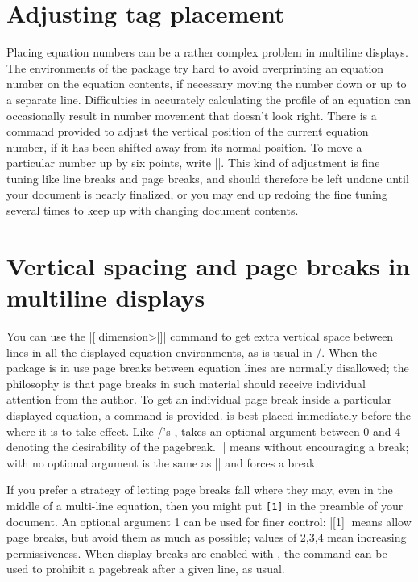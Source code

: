 \documentclass[leqno,titlepage,openany]{amsldoc}[1999/12/13]
\newcommand{\ii}[1]{#1\index{#1}}
\begin{document}
\section{Adjusting tag placement}

Placing equation numbers can be a rather complex problem in multiline
displays. The environments of the  package try hard to
avoid overprinting an equation number on the equation contents, if
necessary moving the number down or up to a separate line. Difficulties
in accurately calculating the profile of an equation can occasionally
result in number movement that doesn't look right. There is a
 command provided to adjust the vertical position of the
current equation number, if it has been shifted away from its normal
position. To move a particular number up by six points, write
|\raisetag{6pt}|. This kind of adjustment is fine tuning like line
breaks and page breaks, and should therefore be left undone until your
document is nearly finalized, or you may end up redoing the fine tuning
several times to keep up with changing document contents.

\section{Vertical spacing and page breaks in multiline displays}

You can use the \cn{\\}|[|\<dimension>|]| command to get extra vertical
space between lines in all the  displayed equation
environments, as is usual in \latex/.  When the  package is
in use \ii{page breaks} between equation lines are normally disallowed;
the philosophy is that page breaks in such material should receive
individual attention from the author. To get an individual page break
inside a particular displayed equation, a  command is
provided.  is best placed immediately before the
\cn{\\} where it is to take effect.  Like \latex/'s ,
 takes an optional argument between 0 and 4 denoting
the desirability of the pagebreak. |\displaybreak[0]| means  without encouraging a break;
 with no optional argument is the same as
|\displaybreak[4]| and forces a break.

If you prefer a strategy of letting page breaks fall where they may,
even in the middle of a multi-line equation, then you might put
\texttt{[1]} in the preamble of your document. An
optional argument 1 can be used for finer control: |[1]| means
allow page breaks, but avoid them as much as possible; values of 2,3,4
mean increasing permissiveness. When display breaks are enabled with
, the \cn{\\*} command can be used to prohibit a
pagebreak after a given line, as usual.
\end{document}
